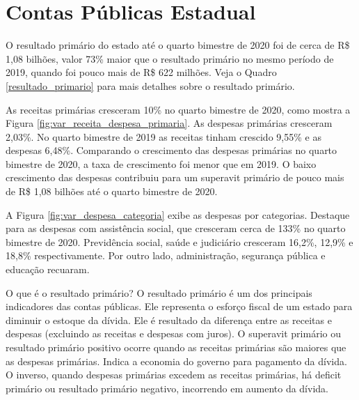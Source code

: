 \hypertarget{contas-puxfablicas-estadual}{%
\chapter{Contas Públicas Estadual}\label{contas-puxfablicas-estadual}}

O resultado primário do estado até o quarto bimestre de 2020 foi de
cerca de R\$ 1,08 bilhões, valor 73\% maior que o resultado primário no
mesmo período de 2019, quando foi pouco mais de R\$ 622 milhões. Veja o
Quadro \ref{resultado_primario} para mais detalhes sobre o resultado
primário.

As receitas primárias cresceram 10\% no quarto bimestre de 2020, como
mostra a Figura \ref{fig:var_receita_despesa_primaria}. As despesas
primárias cresceram 2,03\%. No quarto bimestre de 2019 as receitas tinham
crescido 9,55\% e as despesas 6,48\%. Comparando o crescimento das
despesas primárias no quarto bimestre de 2020, a taxa de crescimento foi
menor que em 2019. O baixo crescimento das despesas contribuiu para um
superavit primário de pouco mais de R\$ 1,08 bilhões até o quarto
bimestre de 2020.

A Figura \ref{fig:var_despesa_categoria} exibe as despesas por
categorias. Destaque para as despesas com assistência social, que
cresceram cerca de 133\% no quarto bimestre de 2020. Previdência social,
saúde e judiciário cresceram 16,2\%, 12,9\% e 18,8\% respectivamente. Por
outro lado, administração, segurança pública e educação recuaram.

\begin{smbox}[label={resultado_primario}, nameref={O que é o resultado primário}]{O que é o resultado primário?}
O resultado primário é um dos principais indicadores das contas públicas. Ele representa o esforço fiscal de um estado para diminuir o estoque da dívida. Ele é resultado da diferença entre as receitas e despesas (excluindo as receitas e despesas com juros). O superavit primário ou resultado primário positivo ocorre quando as receitas primárias são maiores que as despesas primárias. Indica a economia do governo para pagamento da dívida. O inverso, quando despesas primárias excedem as receitas primárias, há deficit primário ou resultado primário negativo, incorrendo em aumento da dívida.
\end{smbox}

